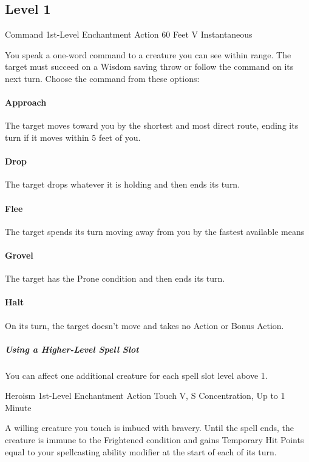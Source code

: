 \documentclass[letterpaper,openany,oneside,twocolumn]{book}
\begin{document}
\subsection*{Level 1}

\DndSpellHeader
  {Command}
  {1st-Level Enchantment}
  {Action}
  {60 Feet}
  {V}
  {Instantaneous}

You speak a one-word command to a creature you can see within range. The target must succeed on a Wisdom saving throw or follow the command on its next turn. Choose the command from these options:

\paragraph*{Approach} The target moves toward you by the shortest and most direct route, ending its turn if it moves within 5 feet of you.

\paragraph*{Drop} The target drops whatever it is holding and then ends its turn.

\paragraph*{Flee} The target spends its turn moving away from you by the fastest available means

\paragraph*{Grovel} The target has the Prone condition and then ends its turn.

\paragraph*{Halt} On its turn, the target doesn't move and takes no Action or Bonus Action.

\subparagraph*{Using a Higher-Level Spell Slot} You can affect one additional creature for each spell slot level above 1.

\DndSpellHeader
  {Heroism}
  {1st-Level Enchantment}
  {Action}
  {Touch}
  {V, S}
  {Concentration, Up to 1 Minute}

A willing creature you touch is imbued with bravery. Until the spell ends, the creature is immune to the Frightened condition and gains Temporary Hit Points equal to your spellcasting ability modifier at the start of each of its turn.
\end{document}
